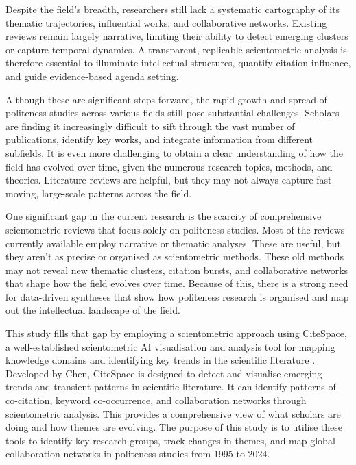 \documentclass[english]{textolivre}
\begin{document}
Despite the field’s breadth, researchers still lack a systematic cartography of its thematic trajectories, influential works, and collaborative networks. Existing reviews remain largely narrative, limiting their ability to detect emerging clusters or capture temporal dynamics. A transparent, replicable scientometric analysis is therefore essential to illuminate intellectual structures, quantify citation influence, and guide evidence-based agenda setting.

Although these are significant steps forward, the rapid growth and spread of politeness studies across various fields still pose substantial challenges. Scholars are finding it increasingly difficult to sift through the vast number of publications, identify key works, and integrate information from different subfields. It is even more challenging to obtain a clear understanding of how the field has evolved over time, given the numerous research topics, methods, and theories. Literature reviews are helpful, but they may not always capture fast-moving, large-scale patterns across the field.

One significant gap in the current research is the scarcity of comprehensive scientometric reviews that focus solely on politeness studies. Most of the reviews currently available employ narrative or thematic analyses. These are useful, but they aren’t as precise or organised as scientometric methods. These old methods may not reveal new thematic clusters, citation bursts, and collaborative networks that shape how the field evolves over time. Because of this, there is a strong need for data-driven syntheses that show how politeness research is organised and map out the intellectual landscape of the field.

This study fills that gap by employing a scientometric approach using CiteSpace, a well-established scientometric AI visualisation and analysis tool for mapping knowledge domains and identifying key trends in the scientific literature \cite{chen2006, chen2010}. Developed by Chen, CiteSpace is designed to detect and visualise emerging trends and transient patterns in scientific literature. It can identify patterns of co-citation, keyword co-occurrence, and collaboration networks through scientometric analysis. This provides a comprehensive view of what scholars are doing and how themes are evolving. The purpose of this study is to utilise these tools to identify key research groups, track changes in themes, and map global collaboration networks in politeness studies from 1995 to 2024.
\end{document}
